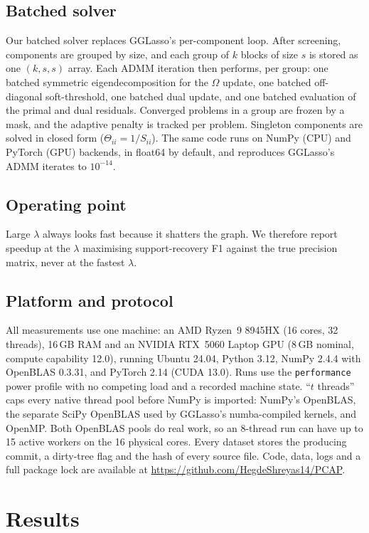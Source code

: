 \documentclass[pdflatex,sn-mathphys-num]{sn-jnl}
\begin{document}
\subsection{Batched solver}
\label{sec:batched}
Our batched solver replaces GGLasso's per-component loop. After screening,
components are grouped by size, and each group of $k$ blocks of size $s$ is
stored as one $(k,s,s)$ array. Each ADMM iteration then performs, per group:
one batched symmetric eigendecomposition for the $\Omega$ update, one
batched off-diagonal soft-threshold, one batched dual update, and one batched
evaluation of the primal and dual residuals. Converged problems in a group
are frozen by a mask, and the adaptive penalty is tracked per problem.
Singleton components are solved in closed form ($\Theta_{ii}=1/S_{ii}$). The
same code runs on NumPy (CPU) and PyTorch (GPU) backends, in float64 by
default, and reproduces GGLasso's ADMM iterates to $10^{-14}$.
\subsection{Operating point}
Large $\lambda$ always looks fast because it shatters the graph. We
therefore report speedup at the $\lambda$ maximising support-recovery F1
against the true precision matrix, never at the fastest $\lambda$.
\subsection{Platform and protocol}
All measurements use one machine: an AMD Ryzen~9 8945HX (16 cores, 32
threads), 16\,GB RAM and an NVIDIA RTX~5060 Laptop GPU (8\,GB nominal,
compute capability 12.0), running Ubuntu 24.04, Python 3.12, NumPy 2.4.4 with
OpenBLAS 0.3.31, and PyTorch 2.14 (CUDA 13.0). Runs use the
\texttt{performance} power profile with no competing load and a recorded
machine state. ``$t$ threads'' caps every native thread pool before NumPy is
imported: NumPy's OpenBLAS, the separate SciPy OpenBLAS used by GGLasso's
numba-compiled kernels, and OpenMP. Both OpenBLAS pools do real work, so an
8-thread run can have up to 15 active workers on the 16 physical cores. Every dataset
stores the producing commit, a dirty-tree flag and the hash of every source
file. Code, data, logs and a full package lock are available at
\url{https://github.com/HegdeShreyas14/PCAP}.
\section{Results}
\end{document}
